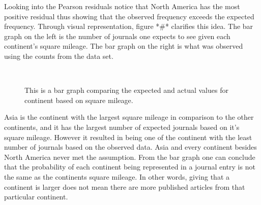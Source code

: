 \documentclass[12pt, letterpaper]{article}
\begin{document}
Looking into the Pearson residuals notice that North America has the most positive residual thus showing that the observed frequency exceeds the expected frequency. Through visual representation, figure *#* clarifies this idea. The bar graph on the left is the number of journals one expects to see given each continent's square mileage. The bar graph on the right is what was observed using the counts from the data set.
\begin{figure}[h]
\begin{center}
\includegraphics[width=0.10]{Continent2BarGraph.pdf}
\label{fig: Continent Bar Graph}
\caption{This is a bar graph comparing the expected and actual values for continent based on square mileage.}
\end{center}
\end{figure}

Asia is the continent with the largest square mileage in comparison to the other continents, and it has the largest number of expected journals based on it's square mileage. However it resulted in being one of the continent with the least number of journals based on the observed data. Asia and every continent besides North America never met the assumption. From the bar graph one can conclude that the probability of each continent being represented in a journal entry is not the same as the continents square mileage. In other words, giving that a continent is larger does not mean there are more published articles from that particular continent.
\end{document}
